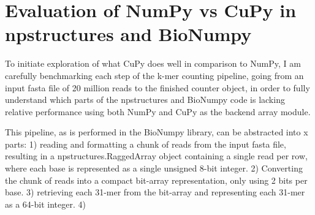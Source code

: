 \section{Evaluation of NumPy vs CuPy in npstructures and BioNumpy}
To initiate exploration of what CuPy does well in comparison to NumPy, I am carefully benchmarking each step of the k-mer counting pipeline, going from an input fasta file of 20 million reads to the finished counter object, in order to fully understand which parts of the npstructures and BioNumpy code is lacking relative performance using both NumPy and CuPy as the backend array module.

This pipeline, as is performed in the BioNumpy library, can be abstracted into x parts: 1) reading and formatting a chunk of reads from the input fasta file, resulting in a npstructures.RaggedArray object containing a single read per row, where each base is represented as a single unsigned 8-bit integer. 2) Converting the chunk of reads into a compact bit-array representation, only using 2 bits per base. 3) retrieving each 31-mer from the bit-array and representing each 31-mer as a 64-bit integer. 4) 
